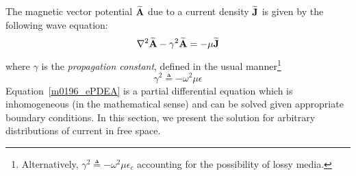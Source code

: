 

\label{m0196_Solution_of_the_Wave_Equation_for_Magnetic_Vector_Potential} %

The magnetic vector potential $\widetilde{\bf A}$ due to a current density $\widetilde{\bf J}$ is given by the following wave equation:
%
\begin{equation}
\nabla^2 \widetilde{\bf A}
-\gamma^2\widetilde{\bf A} 
= 
-\mu\widetilde{\bf J}
\label{m0196_ePDEA}
\end{equation}
%
where $\gamma$ is the \emph{propagation constant}, 
defined in the usual manner\footnote{Alternatively, $\gamma^2\triangleq -\omega^2\mu\epsilon_c$ accounting for the possibility of lossy media.}
%
\begin{equation}
\gamma^2\triangleq -\omega^2\mu\epsilon
\end{equation}
%
Equation~\ref{m0196_ePDEA} is a partial differential equation which is inhomogeneous (in the mathematical sense) and can be solved given appropriate boundary conditions.
In this section, we present the solution for arbitrary distributions of current in free space.

